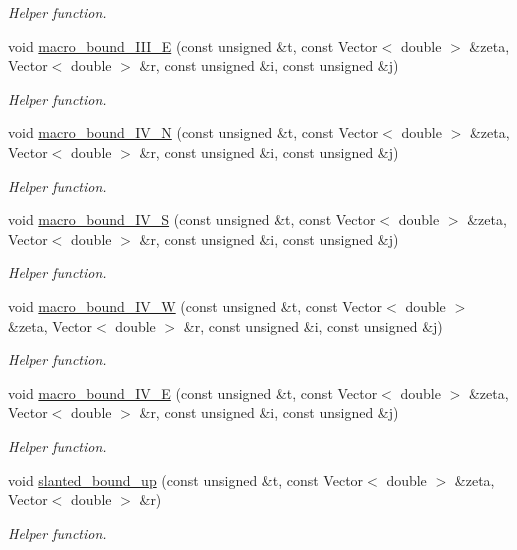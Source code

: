 \begin{DoxyCompactItemize}
\begin{DoxyCompactList}\small\item\em Helper function. \end{DoxyCompactList}\item 
void \hyperlink{classoomph_1_1ChannelWithLeafletDomain_af17451c66c723d841aa6f16505c51be3}{macro\+\_\+bound\+\_\+\+I\+I\+I\+\_\+E} (const unsigned \&t, const Vector$<$ double $>$ \&zeta, Vector$<$ double $>$ \&r, const unsigned \&i, const unsigned \&j)
\begin{DoxyCompactList}\small\item\em Helper function. \end{DoxyCompactList}\item 
void \hyperlink{classoomph_1_1ChannelWithLeafletDomain_ae8d9410d270e27677cb89c5dfe9cc136}{macro\+\_\+bound\+\_\+\+I\+V\+\_\+N} (const unsigned \&t, const Vector$<$ double $>$ \&zeta, Vector$<$ double $>$ \&r, const unsigned \&i, const unsigned \&j)
\begin{DoxyCompactList}\small\item\em Helper function. \end{DoxyCompactList}\item 
void \hyperlink{classoomph_1_1ChannelWithLeafletDomain_a038eba8447f4d1643cd44642294bf43f}{macro\+\_\+bound\+\_\+\+I\+V\+\_\+S} (const unsigned \&t, const Vector$<$ double $>$ \&zeta, Vector$<$ double $>$ \&r, const unsigned \&i, const unsigned \&j)
\begin{DoxyCompactList}\small\item\em Helper function. \end{DoxyCompactList}\item 
void \hyperlink{classoomph_1_1ChannelWithLeafletDomain_ab9da487d185f947a30e03b43d0fc0c9b}{macro\+\_\+bound\+\_\+\+I\+V\+\_\+W} (const unsigned \&t, const Vector$<$ double $>$ \&zeta, Vector$<$ double $>$ \&r, const unsigned \&i, const unsigned \&j)
\begin{DoxyCompactList}\small\item\em Helper function. \end{DoxyCompactList}\item 
void \hyperlink{classoomph_1_1ChannelWithLeafletDomain_a16c8d718f5da2e6d9d73fe0455bacc0c}{macro\+\_\+bound\+\_\+\+I\+V\+\_\+E} (const unsigned \&t, const Vector$<$ double $>$ \&zeta, Vector$<$ double $>$ \&r, const unsigned \&i, const unsigned \&j)
\begin{DoxyCompactList}\small\item\em Helper function. \end{DoxyCompactList}\item 
void \hyperlink{classoomph_1_1ChannelWithLeafletDomain_aaca0af9c2a638c80bd8af783b9972599}{slanted\+\_\+bound\+\_\+up} (const unsigned \&t, const Vector$<$ double $>$ \&zeta, Vector$<$ double $>$ \&r)
\begin{DoxyCompactList}\small\item\em Helper function. \end{DoxyCompactList}\end{DoxyCompactItemize}
